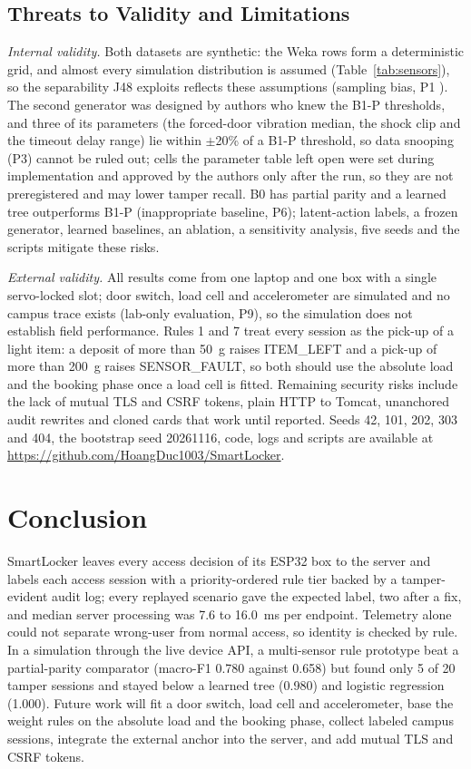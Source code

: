 \documentclass[sigconf,screen]{acmart}
\begin{document}
\subsection{Threats to Validity and Limitations}\label{sec:limits}

\textit{Internal validity.} Both datasets are synthetic: the Weka rows form a deterministic grid, and almost every
simulation distribution is assumed (Table~\ref{tab:sensors}), so the separability J48 exploits reflects these
assumptions (sampling bias, P1 \cite{arp2022dos}). The second generator was designed by authors who knew the B1-P
thresholds, and three of its parameters (the forced-door vibration median, the shock clip and the timeout delay range)
lie within $\pm$20\% of a B1-P threshold, so data snooping (P3) cannot be ruled out; cells the parameter table left open were set
during implementation and approved by the authors only after the run, so they are not preregistered and may lower
tamper recall. B0 has partial parity and a learned tree outperforms B1-P (inappropriate baseline, P6); latent-action
labels, a frozen generator, learned baselines, an ablation, a sensitivity analysis, five seeds and the scripts mitigate
these risks.

\textit{External validity.} All results come from one laptop and one box with a single servo-locked slot; door switch,
load cell and accelerometer are simulated and no campus trace exists (lab-only evaluation, P9), so the simulation does
not establish field performance. Rules 1 and 7 treat every session as the pick-up of a light item: a
deposit of more than 50~g raises ITEM\_LEFT and a pick-up of more than 200~g raises SENSOR\_FAULT, so both should use
the absolute load and the booking phase once a load cell is fitted. Remaining security
risks include the lack of mutual TLS and CSRF tokens, plain HTTP to
Tomcat, unanchored audit rewrites and cloned cards that work until reported. Seeds 42, 101, 202, 303 and 404, the
bootstrap seed 20261116, code, logs and scripts are available at \url{https://github.com/HoangDuc1003/SmartLocker}.

\section{Conclusion}

SmartLocker leaves every access decision of its ESP32 box to the server and labels each access session with a
priority-ordered rule tier backed by a tamper-evident audit log; every replayed scenario gave the expected label, two
after a fix, and median server processing was 7.6 to 16.0~ms per endpoint. Telemetry alone could not separate wrong-user from normal access, so identity is checked by rule.
In a simulation through the live device API, a multi-sensor rule prototype beat a partial-parity comparator (macro-F1
0.780 against 0.658) but found only 5 of 20 tamper sessions and stayed below a learned tree (0.980) and logistic
regression (1.000). Future work will fit a door switch, load cell and accelerometer, base the weight rules on the
absolute load and the booking phase, collect labeled campus sessions, integrate the external anchor into the server,
and add mutual TLS and CSRF tokens.
\end{document}
